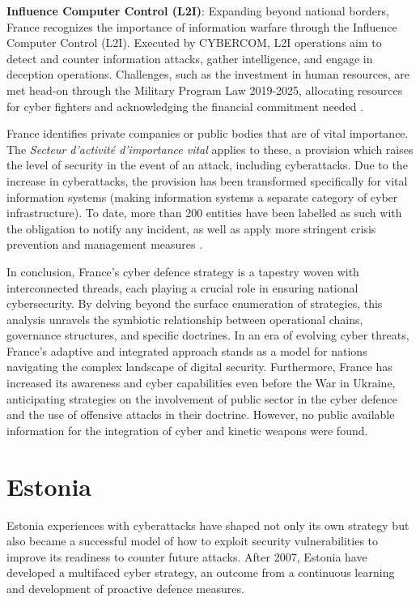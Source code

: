 \textbf{Influence Computer Control (L2I)}: Expanding beyond national borders, France recognizes the importance of information warfare through the Influence Computer Control (L2I). Executed by CYBERCOM, L2I operations aim to detect and counter information attacks, gather intelligence, and engage in deception operations. Challenges, such as the investment in human resources, are met head-on through the Military Program Law 2019-2025, allocating resources for cyber fighters and acknowledging the financial commitment needed \autocite{ministredesarmes_2021_lments}.

France identifies private companies or public bodies that are of vital importance. The \textit{Secteur d'activité d'importance vital} applies to these, a provision which raises the level of security in the event of an attack, including cyberattacks. Due to the increase in cyberattacks, the provision has been transformed specifically for vital information systems (making information systems a separate category of cyber infrastructure). To date, more than 200 entities have been labelled as such with the obligation to notify any incident, as well as apply more stringent crisis prevention and management measures \autocite{anssi_2022_le}.

In conclusion, France's cyber defence strategy is a tapestry woven with interconnected threads, each playing a crucial role in ensuring national cybersecurity. By delving beyond the surface enumeration of strategies, this analysis unravels the symbiotic relationship between operational chains, governance structures, and specific doctrines. In an era of evolving cyber threats, France's adaptive and integrated approach stands as a model for nations navigating the complex landscape of digital security. Furthermore, France has increased its awareness and cyber capabilities even before the War in Ukraine, anticipating strategies on the involvement of public sector in the cyber defence and the use of offensive attacks in their doctrine. However, no public available information for the integration of cyber and kinetic weapons were found. 

\section{Estonia}
Estonia experiences with cyberattacks have shaped not only its own strategy but also became a successful model of how to exploit security vulnerabilities to improve its readiness to counter future attacks. After 2007, Estonia have developed a multifaced cyber strategy, an outcome from a continuous learning and development of proactive defence measures. 

